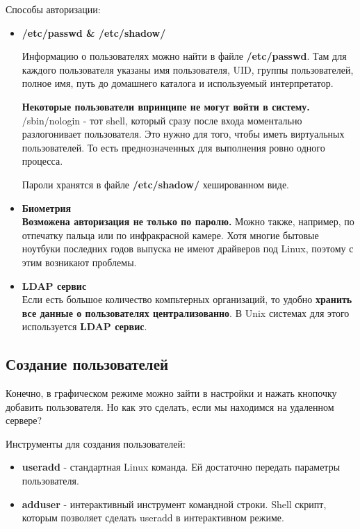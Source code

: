 Способы авторизации:
\begin{itemize}
	\item \textbf{/etc/passwd \& /etc/shadow/}
	
	Информацию о пользователях можно найти в файле \textbf{/etc/passwd}. Там для каждого пользователя
	указаны имя пользователя, UID, группы пользователей, полное имя, путь до домашнего каталога и используемый интерпретатор.
	
	\textbf{Некоторые пользователи впринципе не могут войти в систему.} /sbin/nologin - тот shell, который сразу после входа моментально разлогонивает пользователя. Это нужно для того, чтобы иметь виртуальных пользователей. То есть преднозначенных для выполнения ровно одного процесса.
	
	Пароли хранятся в файле \textbf{/etc/shadow/} хешированном виде.
	
	\item \textbf{Биометрия} \\
	\textbf{Возможена авторизация не только по паролю.} Можно также, например, по отпечатку пальца 
	или по инфракрасной камере. Хотя многие бытовые ноутбуки последних годов выпуска не
	имеют драйверов под Linux, поэтому с этим возникают проблемы.
	
	\item \textbf{LDAP сервис} \\
	Если есть большое количество компьтерных организаций, то удобно \textbf{хранить все данные о пользователях централизованно}. В Unix системах для этого используется \textbf{LDAP сервис}.
\end{itemize}


\subsection{Создание пользователей}

Конечно, в графическом режиме можно зайти в настройки и нажать кнопочку добавить пользователя. Но как это сделать, если мы находимся на удаленном сервере?

Инструменты для создания пользователей:
\begin{itemize}
	\item \textbf{useradd} - стандартная Linux команда. Ей достаточно передать параметры пользователя.
	\item \textbf{adduser} - интерактивный инструмент командной строки. Shell скрипт, которым позволяет сделать useradd в интерактивном режиме.
\end{itemize}


